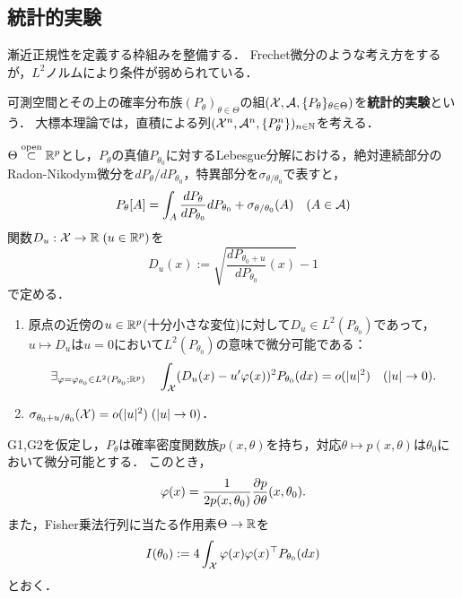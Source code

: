 \documentclass[uplatex,dvipdfmx]{jsreport}
\begin{document}
\subsection{統計的実験}

\begin{tcolorbox}[colframe=ForestGreen, colback=ForestGreen!10!white,breakable,colbacktitle=ForestGreen!40!white,coltitle=black,fonttitle=\bfseries\sffamily,
title=]
    漸近正規性を定義する枠組みを整備する．
    Frechet微分のような考え方をするが，$L^2$ノルムにより条件が弱められている．
\end{tcolorbox}

\begin{definition}
    可測空間とその上の確率分布族$(P_\theta)_{\theta\in\Theta}$の組$(\mathcal{X},\mathcal{A},\{P_\theta\}_{\theta\in\Theta})$を\textbf{統計的実験}という．
    大標本理論では，直積による列$(\mathcal{X}^n,\mathcal{A}^n,\{P_\theta^n\})_{n\in\mathbb{N}}$を考える．
\end{definition}

\begin{notation}
    $\Theta\overset{\mathrm{open}}{\subset}\mathbb{R}^p$とし，$P_\theta$の真値$P_{\theta_0}$に対するLebesgue分解における，絶対連続部分のRadon-Nikodym微分を$dP_\theta/dP_{\theta_0}$，特異部分を$\sigma_{\theta/\theta_0}$で表すと，
    \[P_\theta[A]=\int_A\frac{dP_\theta}{dP_{\theta_0}}dP_{\theta_0}+\sigma_{\theta/\theta_0}(A)\quad(A\in\mathcal{A})\]
    関数$D_u:\mathcal{X}\to\mathbb{R}\;(u\in\mathbb{R}^p)$を
    \[D_u(x):=\sqrt{\frac{dP_{\theta_0+u}}{dP_{\theta_0}}(x)}-1\]
    で定める．
\end{notation}

\begin{enumerate}[({G}1)]
    \item 原点の近傍の$u\in\mathbb{R}^p$(十分小さな変位)に対して$D_u\in L^2(P_{\theta_0})$であって，$u\mapsto D_u$は$u=0$において$L^2(P_{\theta_0})$の意味で微分可能である：
    \[\exists_{\varphi=\varphi_{\theta_0}\in L^2(P_{\theta_0};\mathbb{R}^p)}\quad\int_{\mathcal{X}}(D_u(x)-u'\varphi(x))^2P_{\theta_0}(dx)=o(\lvert u\rvert^2)\quad(\lvert u\rvert\to0).\]
    \item $\sigma_{\theta_0+u/\theta_0}(\mathcal{X})=o(\lvert u\rvert^2)\;(\lvert u\rvert\to0)$．
\end{enumerate}

\begin{lemma}
    G1,G2を仮定し，$P_\theta$は確率密度関数族$p(x,\theta)$を持ち，対応$\theta\mapsto p(x,\theta)$は$\theta_0$において微分可能とする．
    このとき，
    \[\varphi(x)=\frac{1}{2p(x,\theta_0)}\frac{\partial p}{\partial \theta}(x,\theta_0).\]
    また，Fisher乗法行列に当たる作用素$\Theta\to\mathbb{R}$を
    \[I(\theta_0):=4\int_{\mathcal{X}}\varphi(x)\varphi(x)^\top P_{\theta_0}(dx)\]
    とおく．
\end{lemma}
\end{document}
